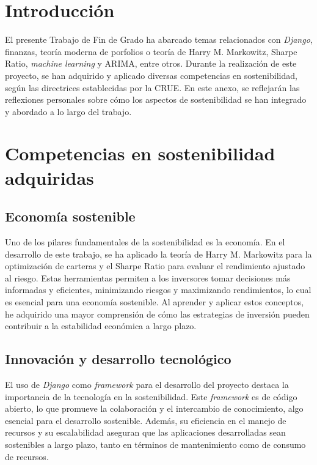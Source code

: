 
\section{Introducción}

El presente Trabajo de Fin de Grado ha abarcado temas relacionados con \emph{Django}, finanzas, teoría moderna de porfolios o teoría de Harry M. Markowitz, Sharpe Ratio, \emph{machine learning} y ARIMA, entre otros. Durante la realización de este proyecto, se han adquirido y aplicado diversas competencias en sostenibilidad, según las directrices establecidas por la CRUE. En este anexo, se reflejarán las reflexiones personales sobre cómo los aspectos de sostenibilidad se han integrado y abordado a lo largo del trabajo.

\section{Competencias en sostenibilidad adquiridas}

\subsection{Economía sostenible}

Uno de los pilares fundamentales de la sostenibilidad es la economía. En el desarrollo de este trabajo, se ha aplicado la teoría de Harry M. Markowitz para la optimización de carteras y el Sharpe Ratio para evaluar el rendimiento ajustado al riesgo. Estas herramientas permiten a los inversores tomar decisiones más informadas y eficientes, minimizando riesgos y maximizando rendimientos, lo cual es esencial para una economía sostenible. Al aprender y aplicar estos conceptos, he adquirido una mayor comprensión de cómo las estrategias de inversión pueden contribuir a la estabilidad económica a largo plazo.

\subsection{Innovación y desarrollo tecnológico}

El uso de \emph{Django} como \emph{framework} para el desarrollo del proyecto destaca la importancia de la tecnología en la sostenibilidad. Este \emph{framework} es de código abierto, lo que promueve la colaboración y el intercambio de conocimiento, algo esencial para el desarrollo sostenible. Además, su eficiencia en el manejo de recursos y su escalabilidad aseguran que las aplicaciones desarrolladas sean sostenibles a largo plazo, tanto en términos de mantenimiento como de consumo de recursos.

